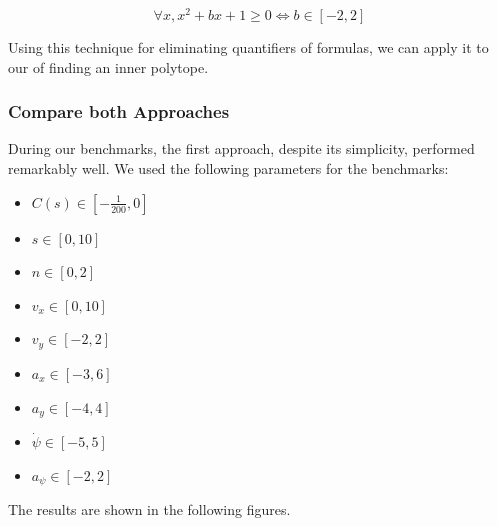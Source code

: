 \[
	\forall x, x^2 + bx + 1 \geq 0 \iff b \in [-2, 2]
\]

Using this technique for eliminating quantifiers of formulas, we can apply it to our of finding an inner polytope.

\subsubsection{Compare both Approaches}

During our benchmarks, the first approach, despite its simplicity, performed remarkably well.
We used the following parameters for the benchmarks:
\begin{itemize}
	\item $C(s) \in \left[-\frac{1}{200}, 0\right]$
	\item $s \in [0, 10]$
	\item $n \in [0, 2]$
	\item $v_x \in [0, 10]$
	\item $v_y \in [-2, 2]$
	\item $a_x \in [-3, 6]$
	\item $a_y \in [-4, 4]$
	\item $\dot{\psi} \in [-5, 5]$
	\item $a_\psi \in [-2, 2]$
\end{itemize}

The results are shown in the following figures.

